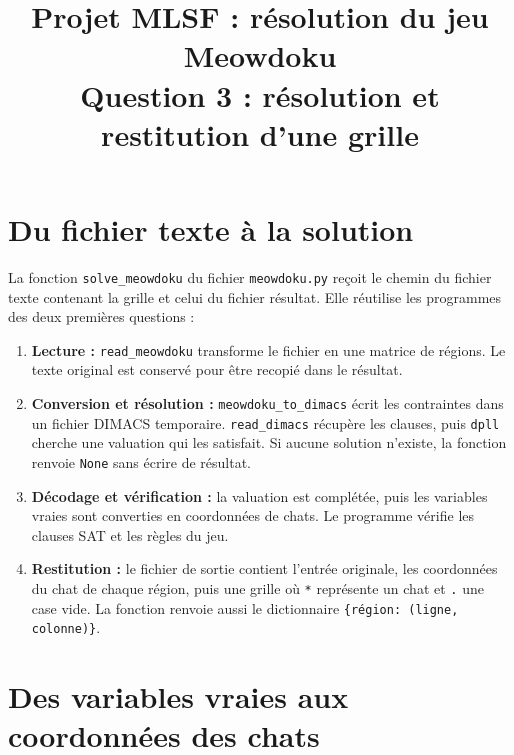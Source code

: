 \documentclass[11pt,a4paper]{article}
\title{Projet MLSF : résolution du jeu Meowdoku\\
  \large Question 3 : résolution et restitution d’une grille}
\author{}
\date{}
\begin{document}
\maketitle

\section{Du fichier texte à la solution}

La fonction \texttt{solve\_meowdoku} du fichier \texttt{meowdoku.py}
reçoit le chemin du fichier texte contenant la grille et celui du fichier
résultat. Elle réutilise les programmes des deux premières questions :
\begin{enumerate}
  \item \textbf{Lecture :} \texttt{read\_meowdoku} transforme le fichier
    en une matrice de régions. Le texte original est conservé pour être
    recopié dans le résultat.
  \item \textbf{Conversion et résolution :} \texttt{meowdoku\_to\_dimacs}
    écrit les contraintes dans un fichier DIMACS temporaire.
    \texttt{read\_dimacs} récupère les clauses, puis \texttt{dpll} cherche
    une valuation qui les satisfait. Si aucune solution n'existe,
    la fonction renvoie \texttt{None} sans écrire de résultat.
  \item \textbf{Décodage et vérification :} la valuation est complétée,
    puis les variables vraies sont converties en coordonnées de chats.
    Le programme vérifie les clauses SAT et les règles du jeu.
  \item \textbf{Restitution :} le fichier de sortie contient l'entrée
    originale, les coordonnées du chat de chaque région, puis une grille
    où \texttt{*} représente un chat et \texttt{.} une case vide.
    La fonction renvoie aussi le dictionnaire
    \texttt{\{région: (ligne, colonne)\}}.
\end{enumerate}

\section{Des variables vraies aux coordonnées des chats}
\end{document}
